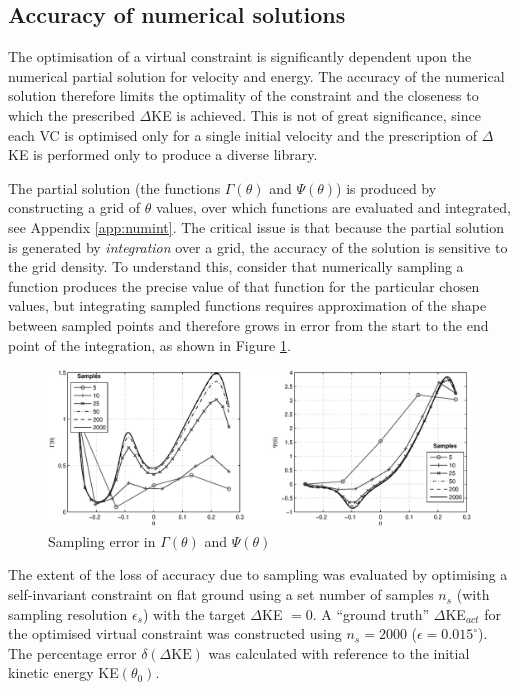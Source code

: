 \subsection{Accuracy of numerical solutions} \label{sec:numsolacc}
The optimisation of a virtual constraint is significantly dependent upon the numerical partial solution for velocity and energy. The accuracy of the numerical solution therefore limits the optimality of the constraint and the closeness to which the prescribed $\Delta$KE is achieved. This is not of great significance, since each VC is optimised only for a single initial velocity and the prescription of $\Delta$KE is performed only to produce a diverse library.

The partial solution (the functions $\Gamma(\theta)$ and $\Psi(\theta)$) is produced by constructing a grid of $\theta$ values, over which functions are evaluated and integrated, see Appendix \ref{app:numint}. The critical issue is that because the partial solution is generated by \textit{integration} over a grid, the accuracy of the solution is sensitive to the grid density. To understand this, consider that numerically sampling a function produces the precise value of that function for the particular chosen values, but integrating sampled functions requires approximation of the shape between sampled points and therefore grows in error from the start to the end point of the integration, as shown in Figure \ref{fig:samplingerror}.

\begin{figure}
	\centering
	\includegraphics[width=\linewidth]{4VirtConstLib/samplingerror.eps}
	\caption{Sampling error in $\Gamma(\theta)$ and $\Psi(\theta)$}
	\label{fig:samplingerror}
\end{figure}

The extent of the loss of accuracy due to sampling was evaluated by optimising a self-invariant constraint on flat ground using a set number of samples $n_s$ (with sampling resolution $\epsilon_s$) with the target $\Delta$KE $=0$. A  ``ground truth'' $\Delta$KE$_{act}$ for the optimised virtual constraint was constructed using $n_s=2000$ ($\epsilon = 0.015^\circ$). The percentage error $\delta(\Delta\mathrm{KE})$ was calculated with reference to the initial kinetic energy KE$(\theta_0)$.

